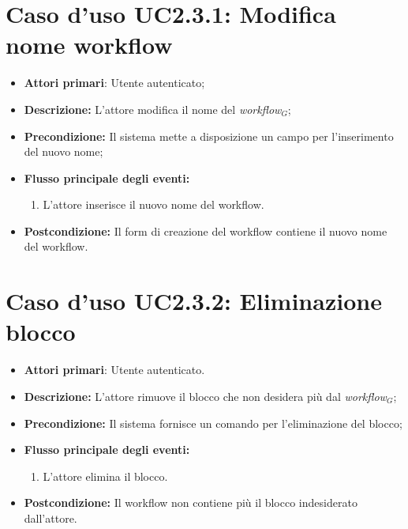 \section{Caso d'uso UC2.3.1: Modifica nome workflow}
\begin{itemize}
	\item \textbf{Attori primari}: Utente autenticato;
	\item \textbf{Descrizione:} L'attore modifica il nome del \textit{workflow$_{G}$};
	\item \textbf{Precondizione:} Il sistema mette a disposizione un campo per l'inserimento del nuovo nome;
	\item \textbf{Flusso principale degli eventi:}
	\begin{enumerate}
		\item L'attore inserisce il nuovo nome del workflow.
	\end{enumerate}
	\item \textbf{Postcondizione:} Il form di creazione del workflow contiene il nuovo nome del workflow.
\end{itemize}
\section{Caso d'uso UC2.3.2: Eliminazione blocco }
\begin{itemize}
	\item \textbf{Attori primari}: Utente autenticato.
	\item \textbf{Descrizione:} L'attore rimuove il blocco che non desidera più dal \textit{workflow$_{G}$};
	\item \textbf{Precondizione:} Il sistema fornisce un comando per l'eliminazione del blocco;
	\item \textbf{Flusso principale degli eventi:}
	\begin{enumerate}
		\item L'attore elimina il blocco.
	\end{enumerate}
	\item \textbf{Postcondizione:} Il workflow non contiene più il blocco indesiderato dall'attore.
\end{itemize}
